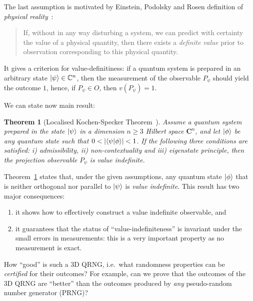 \documentclass[11pt,a4paper]{article}
\newtheorem{theorem}{Theorem}
\begin{document}
The last assumption is motivated by  Einstein, Podolsky and Rosen  definition of {\em physical reality}~\cite[p.~777]{epr}:

 \begin{quote}
         If, without in any way disturbing a system, we can predict with certainty the value of a physical quantity, then there exists a \emph{definite value} prior to observation corresponding to this physical quantity.
\end{quote}
It gives a criterion for value-definitiness: if a quantum system is prepared in an arbitrary state $\ket{\psi}\in\mathbb{C}^{n}$, then the measurement of the observable $P_{\psi}$ should yield the outcome $1$, hence, if $P_{\psi}\in O$, then $v(P_{\psi})=1.$

We can state now main result:


\begin{theorem}[Localised Kochen-Specker Theorem~\cite{Abbott:2010uq,acs-2015-info6040773,PhysRevLett.119.240501, aguero_trejo_new_2021}]
\label{EffecKS}
        Assume a quantum system prepared in the state
$\ket{\psi}$ in a dimension $n\ge 3$ Hilbert space ${\mathbf C}^n$, and let $\ket{\phi}$
be any quantum state such that  $0<\abs{\bra{\psi}\ket{\phi}}<1$. If the following three conditions are satisfied: i) admissibility, ii) non-contextuality and iii)
eigenstate principle,
then the projection observable $P_\psi$ is  value
indefinite.
\end{theorem}


Theorem~\ref{EffecKS} states that, under the given assumptions,  any quantum state $\ket{\phi}$ that is  neither orthogonal nor parallel to $\ket{\psi}$ is {\it value indefinite}. This result has two major consequences:

\begin{enumerate}
    \item it shows how to effectively construct a value indefinite observable, and
    \item it guarantees that the status of ``value-indefiniteness'' is invariant under the small errors in measurements: this is a very important property as no measurement is exact.
\end{enumerate}



How ``good'' is such a 3D QRNG, i.e.~what randomness properties can be {\it certified} for their outcomes?  For example, can we prove that the outcomes of the 3D QRNG are ``better'' than the outcomes produced by {\it any} pseudo-random number generator (PRNG)?
\end{document}
